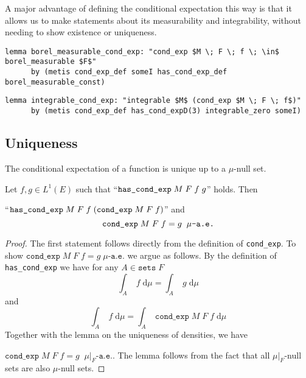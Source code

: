 A major advantage of defining the conditional expectation this way is that it allows us to make statements about its measurability and integrability, without needing to show existence or uniqueness.

\begin{isalemma}
{\small
	\begin{lstlisting}[style=isabelle]
	lemma borel_measurable_cond_exp: "cond_exp $M \; F \; f \; \in$ borel_measurable $F$"
	  by (metis cond_exp_def someI has_cond_exp_def borel_measurable_const)
	\end{lstlisting}
}
\end{isalemma}

\begin{isalemma}
{\small
	\begin{lstlisting}[style=isabelle]
	lemma integrable_cond_exp: "integrable $M$ (cond_exp $M \; F \; f$)"
	  by (metis cond_exp_def has_cond_expD(3) integrable_zero someI)
	\end{lstlisting}
}
\end{isalemma}

\subsection{Uniqueness}

The conditional expectation of a function is unique up to a $\mu$-null set. 

\begin{lemma}
	Let $f, g \in L^1(E)$ such that ``$\normalfont\texttt{has\_cond\_exp} \; M \; F \; f \; g$'' holds. Then 
	\par\noindent ``$\normalfont\texttt{has\_cond\_exp} \; M \; F \; f \; (\texttt{cond\_exp} \; M \; F \; f)$'' and
	\[
		\normalfont\texttt{cond\_exp} \; M \; F \; f = g \;\; \mu\texttt{-a.e.}
	\]
\end{lemma}
\begin{proof}
	The first statement follows directly from the definition of \texttt{cond\_exp}. To show $\texttt{cond\_exp} \; M \; F \; f = g \; \mu\texttt{-a.e.}$ we argue as follows. By the definition of \texttt{has\_cond\_exp} we have for any $A \in \texttt{sets} \; F$
	\[
		\int_A \; f \; \textrm{d}\mu = \int_A \; g \; \textrm{d}\mu
	\]
	and
	\[
		\int_A \; f \; \textrm{d}\mu = \int_A \; \texttt{cond\_exp} \; M \; F \; f \; \textrm{d}\mu
	\]
	Together with the lemma on the uniqueness of densities, we have 
	\par\noindent$\texttt{cond\_exp} \; M \; F \; f = g \;\; \mu\vert_F\texttt{-a.e.}$. The lemma follows from the fact that all $\mu\vert_F$-null sets are also $\mu$-null sets.
\end{proof}

